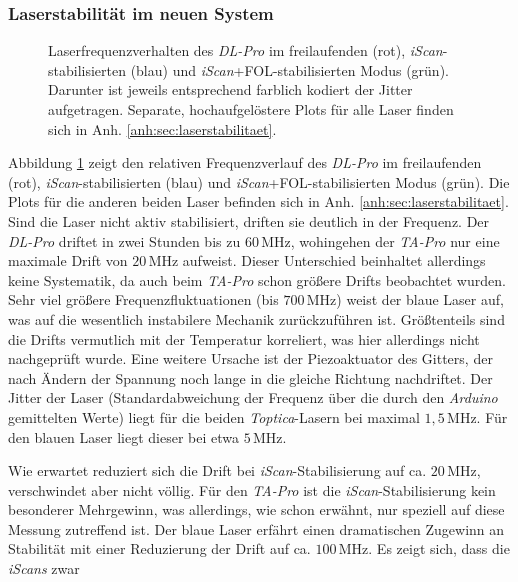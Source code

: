\subsubsection{Laserstabilität im neuen
System}\label{subsubsec:stabilitaetsmessungen_software_neues_system}
\begin{figure}[h]
 	\centering
 	\footnotesize
	
	\caption[Laserfrequenzverhalten \textit{DL-Pro}]{Laserfrequenzverhalten des
	\textit{DL-Pro} im freilaufenden (rot), \textit{iScan}-stabilisierten (blau)
	und \textit{iScan}+FOL-stabilisierten Modus (grün). Darunter ist jeweils
	entsprechend farblich kodiert der Jitter aufgetragen. Separate,
	hochaufgelöstere Plots für alle Laser finden sich in Anh.
	\ref{anh:sec:laserstabilitaet}.}
	\label{fig:laserstabilitaet_b_alles}
\end{figure}
Abbildung \ref{fig:laserstabilitaet_b_alles} zeigt den relativen
Frequenzverlauf des \textit{DL-Pro} im freilaufenden (rot),
\textit{iScan}-stabilisierten (blau) und \textit{iScan}+FOL-stabilisierten Modus
(grün). Die Plots für die anderen beiden Laser befinden sich in Anh.
\ref{anh:sec:laserstabilitaet}. Sind die Laser nicht aktiv stabilisiert, driften
sie deutlich in der Frequenz. Der \textit{DL-Pro} driftet in zwei Stunden bis zu $60\,$MHz, wohingehen der
\textit{TA-Pro} nur eine maximale Drift von $20\,$MHz aufweist. Dieser
Unterschied beinhaltet allerdings keine Systematik, da auch beim \textit{TA-Pro}
schon größere Drifts beobachtet wurden. Sehr viel größere Frequenzfluktuationen (bis $700\,$MHz)
weist der blaue Laser auf, was auf die wesentlich instabilere Mechanik
zurückzuführen ist. Größtenteils sind die Drifts vermutlich mit der Temperatur
korreliert, was hier allerdings nicht nachgeprüft wurde. Eine weitere Ursache
ist der Piezoaktuator des Gitters, der nach Ändern der Spannung noch lange in
die gleiche Richtung nachdriftet. Der Jitter der Laser (Standardabweichung der
Frequenz über die durch den \textit{Arduino} gemittelten Werte) liegt für die
beiden \textit{Toptica}-Lasern bei maximal $1,5\,$MHz. Für den blauen Laser
liegt dieser bei etwa $5\,$MHz.\par
Wie erwartet reduziert sich die Drift bei \textit{iScan}-Stabilisierung auf ca. $20\,$MHz,
verschwindet aber nicht völlig. Für den \textit{TA-Pro} ist die
\textit{iScan}-Stabilisierung kein besonderer Mehrgewinn, was allerdings, wie
schon erwähnt, nur speziell auf diese Messung zutreffend ist. Der blaue Laser
erfährt einen dramatischen Zugewinn an Stabilität mit einer Reduzierung der
Drift auf ca. $100\,$MHz. Es zeigt sich, dass die \textit{iScans} zwar
